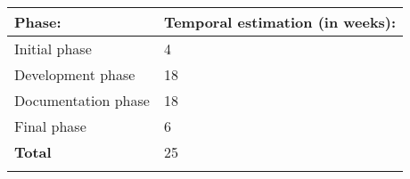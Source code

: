 \begin{center}
  \begin{tabularx}{0.60\textwidth}{|X|X|}
    \firsthline
    \textbf{Phase:} & \textbf{Temporal estimation (in weeks):} \\
    \hline
    Initial phase & 4 \\
    \hline
    Development phase & 18 \\
    \hline
    Documentation phase & 18 \\
    \hline
    Final phase & 6 \\
    \hline
    \textbf{Total} & 25 \\
    \lasthline
  \end{tabularx}
\end{center}

\newpage
{}

\newpage
{}

